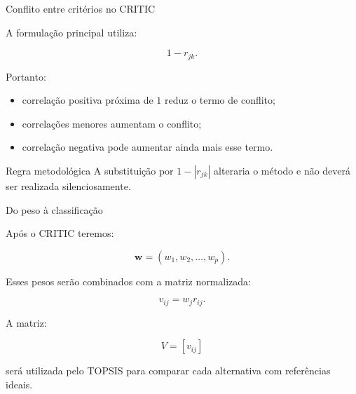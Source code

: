 
\begin{frame}{Conflito entre critérios no CRITIC}

    A formulação principal utiliza:

    \[
    1-r_{jk}.
    \]

    \vspace{0.3cm}

    Portanto:

    \begin{itemize}
        \item correlação positiva próxima de \(1\)
              reduz o termo de conflito;

        \item correlações menores aumentam o conflito;

        \item correlação negativa pode aumentar ainda mais esse termo.
    \end{itemize}

    \vspace{0.3cm}

    \begin{alertblock}{Regra metodológica}
        A substituição por \(1-|r_{jk}|\) alteraria o método e não
        deverá ser realizada silenciosamente.
    \end{alertblock}

\end{frame}



\begin{frame}{Do peso à classificação}

    Após o CRITIC teremos:

    \[
    \mathbf{w}
    =
    (w_1,w_2,\ldots,w_p).
    \]

    Esses pesos serão combinados com a matriz normalizada:

    \[
    v_{ij}
    =
    w_j r_{ij}.
    \]

    \vspace{0.3cm}

    A matriz:

    \[
    V=[v_{ij}]
    \]

    será utilizada pelo TOPSIS para comparar cada alternativa com
    referências ideais.

\end{frame}


